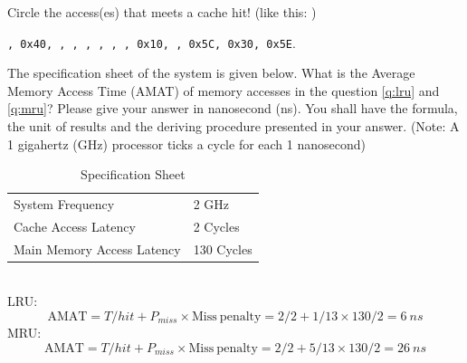 \begin{questions}
{
    \begin{solution}
        Circle the access(es) that meets a cache hit!
        (like this: \texttt{})\\
        \begin{center}
        \texttt{, 0x40, , , , , , , 0x10,
        , 0x5C, 0x30, 0x5E}.
        \end{center}
        \vspace{10px}
    \end{solution}
}

\question[6] 
The specification sheet of the system is given below. What is the
Average Memory Access Time (AMAT) of memory accesses in the question
\ref{q:lru} and \ref{q:mru}? Please give your answer in nanosecond 
(ns). You shall have the formula, the unit of results and the
deriving procedure presented in your answer. (Note: A 1 gigahertz
(GHz) processor ticks a cycle for each 1 nanosecond)

\begin{table}[h]
    \centering
    \begin{tabular}{l l}
        \hline %
        System Frequency           & 2 GHz      \\
        Cache Access Latency       & 2 Cycles   \\
        Main Memory Access Latency & 130 Cycles \\
        \hline %
    \end{tabular}
    \caption{Specification Sheet}
    \label{tab:spec_sheet}
\end{table}

{
    \begin{solution}
        \\
 LRU:\\
        $$
            \mathrm{AMAT}=T/hit+P_{miss}\times \mathrm{Miss\ penalty}
            =2/2+1/13 \times 130/2=6\ ns
        $$
         MRU:\\
        $$
            \mathrm{AMAT}=T/hit+P_{miss}\times \mathrm{Miss\ penalty}
            =2/2+5/13 \times 130/2=26\ ns
        $$
        \vspace{1in}
    \end{solution}
}


\end{questions}
